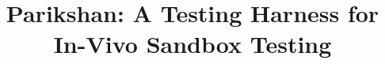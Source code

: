 \documentclass[letterpaper,twocolumn,10pt]{article}
\begin{document}
\date{}

\title{\Large \bf Parikshan: A Testing Harness for In-Vivo Sandbox Testing}


\author{
}

\maketitle

\thispagestyle{empty}











\begin{spacing}{0.8}


\end{spacing}
\end{document}
